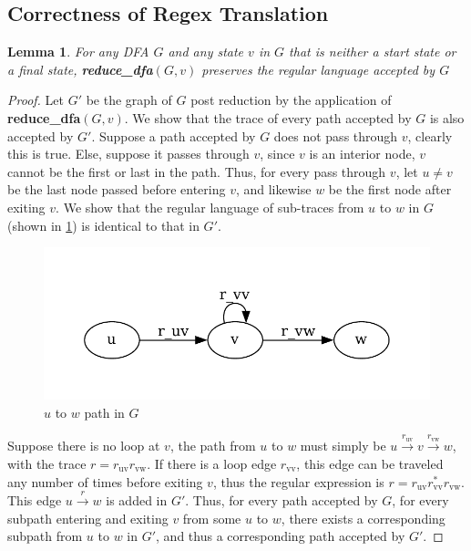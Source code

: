 \documentclass[preprint,12pt]{elsarticle}
\newtheorem{lemma}{Lemma}[section]
\theoremstyle{definition}
\theoremstyle{remark}
\begin{document}
\subsection{Correctness of Regex Translation}
\begin{lemma}
    For any DFA $G$ and any state $v$ in $G$ that is neither a start state or a final state, \textbf{reduce\_dfa}$(G, v)$ preserves the regular language accepted by $G$
\end{lemma}
\begin{proof}
    Let $G'$ be the graph of $G$ post reduction by the application of \textbf{reduce\_dfa}$(G, v)$. We show that the trace of every path accepted by $G$ is also accepted by $G'$. Suppose a path accepted by $G$ does not pass through $v$, clearly this is true. Else, suppose it passes through $v$, since $v$ is an interior node, $v$ cannot be the first or last in the path. Thus, for every pass through $v$, let $u\neq v$ be the last node passed before entering $v$, and likewise $w$ be the first node after exiting $v$. We show that the regular language of sub-traces from $u$ to $w$ in $G$ (shown in \cref{fig:uvw-dfa}) is identical to that in $G'$.
    \begin{figure}[h!]
        \centering
        \includegraphics[scale=0.75]{img/uvw_dfa.pdf}
        \caption{$u$ to $w$ path in $G$}
        \label{fig:uvw-dfa}
    \end{figure}
    Suppose there is no loop at $v$, the path from $u$ to $w$ must simply be $u\xrightarrow{r_\mathrm{uv}}v\xrightarrow{r_\mathrm{vw}}w$, with the trace $r=r_\mathrm{uv}r_\mathrm{vw}$. If there is a loop edge $r_\mathrm{vv}$, this edge can be traveled any number of times before exiting $v$, thus the regular expression is $r=r_\mathrm{uv}r_\mathrm{vv}^*r_\mathrm{vw}$. This edge $u\xrightarrow{r}w$ is added in $G'$. Thus, for every path accepted by $G$, for every subpath entering and exiting $v$ from some $u$ to $w$, there exists a corresponding subpath from $u$ to $w$ in $G'$, and thus a corresponding path accepted by $G'$.
\end{proof}
\end{document}
